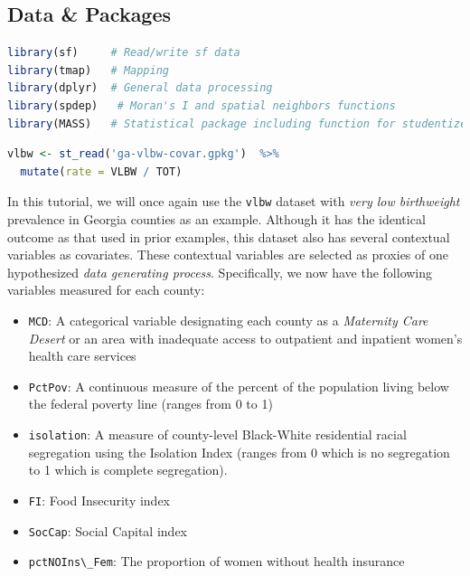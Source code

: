 \documentclass[
]{book}
\newcommand{\passthrough}[1]{#1}
\providecommand{\tightlist}{%
  \setlength{\itemsep}{0pt}\setlength{\parskip}{0pt}}
\begin{document}
\hypertarget{data-packages}{%
\subsection{Data \& Packages}\label{data-packages}}

\begin{lstlisting}[language=R]
library(sf)     # Read/write sf data
library(tmap)   # Mapping
library(dplyr)  # General data processing
library(spdep)   # Moran's I and spatial neighbors functions
library(MASS)   # Statistical package including function for studentized residuals
\end{lstlisting}

\begin{lstlisting}[language=R]
vlbw <- st_read('ga-vlbw-covar.gpkg')  %>%
  mutate(rate = VLBW / TOT)
\end{lstlisting}

In this tutorial, we will once again use the \passthrough{\lstinline!vlbw!} dataset with \emph{very low birthweight} prevalence in Georgia counties as an example. Although it has the identical outcome as that used in prior examples, this dataset also has several contextual variables as covariates. These contextual variables are selected as proxies of one hypothesized \emph{data generating process}. Specifically, we now have the following variables measured for each county:

\begin{itemize}
\tightlist
\item
  \passthrough{\lstinline!MCD!}: A categorical variable designating each county as a \emph{Maternity Care Desert} or an area with inadequate access to outpatient and inpatient women's health care services
\item
  \passthrough{\lstinline!PctPov!}: A continuous measure of the percent of the population living below the federal poverty line (ranges from 0 to 1)
\item
  \passthrough{\lstinline!isolation!}: A measure of county-level Black-White residential racial segregation using the Isolation Index (ranges from 0 which is no segregation to 1 which is complete segregation).
\item
  \passthrough{\lstinline!FI!}: Food Insecurity index
\item
  \passthrough{\lstinline!SocCap!}: Social Capital index
\item
  \passthrough{\lstinline!pctNOIns\_Fem!}: The proportion of women without health insurance
\end{itemize}
\end{document}
